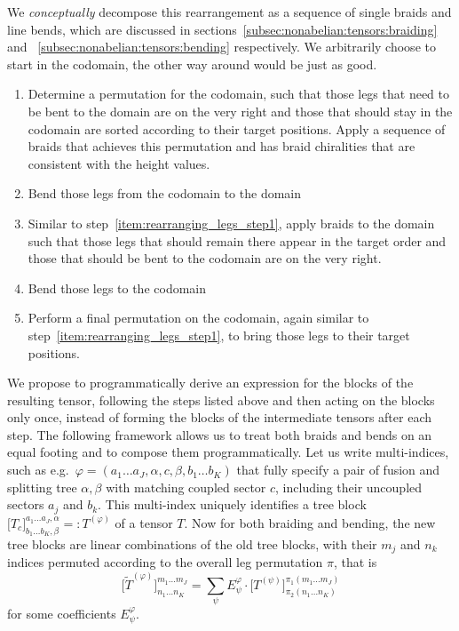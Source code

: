 We \emph{conceptually} decompose this rearrangement as a sequence of single braids and line bends, which are discussed in sections~\ref{subsec:nonabelian:tensors:braiding} and ~\ref{subsec:nonabelian:tensors:bending} respectively.
%
We arbitrarily choose to start in the codomain, the other way around would be just as good.
\begin{enumerate}
    \item\label{item:rearranging_legs_step1}
    Determine a permutation for the codomain, such that those legs that need to be bent to the domain are on the very right and those that should stay in the codomain are sorted according to their target positions. Apply a sequence of braids that achieves this permutation and has braid chiralities that are consistent with the height values.
    \item
    Bend those legs from the codomain to the domain
    \item
    Similar to step~\ref{item:rearranging_legs_step1}, apply braids to the domain such that those legs that should remain there appear in the target order and those that should be bent to the codomain are on the very right.
    \item
    Bend those legs to the codomain
    \item
    Perform a final permutation on the codomain, again similar to step~\ref{item:rearranging_legs_step1}, to bring those legs to their target positions.
\end{enumerate}

We propose to programmatically derive an expression for the blocks of the resulting tensor, following the steps listed above and then acting on the blocks only once, instead of forming the blocks of the intermediate tensors after each step.
%
The following framework allows us to treat both braids and bends on an equal footing and to compose them programmatically.
%
Let us write multi-indices, such as e.g.~$\varphi = (a_1 \dots a_J, \alpha, c, \beta, b_1 \dots b_K)$ that fully specify a pair of fusion and splitting tree $\alpha, \beta$ with matching coupled sector $c$, including their uncoupled sectors $a_j$ and $b_k$.
%
This multi-index uniquely identifies a tree block $\big[ T_c \big]^{a_1 \dots a_J,\alpha}_{b_1 \dots b_K,\beta} =: T^{(\varphi)}$ of a tensor $T$.
%
Now for both braiding and bending, the new tree blocks are linear combinations of the old tree blocks, with their $m_j$ and $n_k$ indices permuted according to the overall leg permutation $\pi$, that is
\begin{equation}
    \label{eq:nonabelian:tensors:leg_rearrangement_general_linear_comb}
    \big[ \tilde{T}^{(\varphi)} \big]^{m_1\dots m_J}_{n_1\dots n_K}
    = \sum_\psi E_\psi^\varphi \cdot
    \big[ T^{(\psi)} \big]^{\pi_1(m_1\dots m_J)}_{\pi_2(n_1\dots n_K)}
\end{equation}
for some coefficients $E_\psi^\varphi$.

